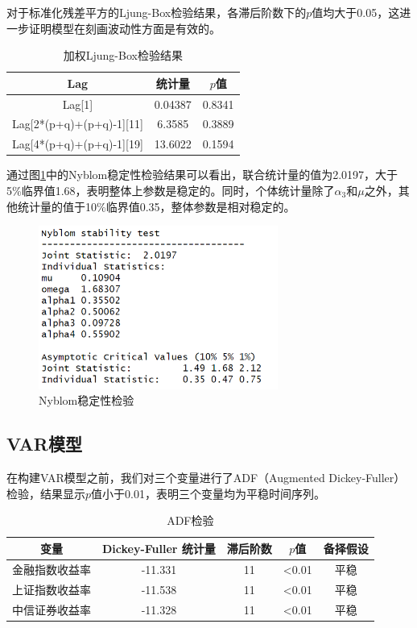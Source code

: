 \documentclass[12pt]{article}
\begin{document}
对于标准化残差平方的Ljung-Box检验结果，各滞后阶数下的$p$值均大于0.05，这进一步证明模型在刻画波动性方面是有效的。

\begin{table}[H]
    \centering
    \caption{加权Ljung-Box检验结果}
    \begin{tabular}{ccc}
        \toprule
        Lag & 统计量 & $p$值\\ 
        \midrule
        Lag[1] & 0.04387 & 0.8341\\
Lag[2*(p+q)+(p+q)-1][11] & 6.3585 & 0.3889\\
Lag[4*(p+q)+(p+q)-1][19] & 13.6022 & 0.1594\\
        \bottomrule
    \end{tabular}
\end{table}

通过图\ref{fig:Nyblom}中的Nyblom稳定性检验结果可以看出，联合统计量的值为2.0197，大于5\%临界值1.68，表明整体上参数是稳定的。同时，个体统计量除了$\alpha_{3}$和$\mu$之外，其他统计量的值于10\%临界值0.35，整体参数是相对稳定的。

\begin{figure}[H]
\centering
\includegraphics[width=0.7\textwidth]{Nyblom.png}
\caption{Nyblom稳定性检验}
\label{fig:Nyblom}
\end{figure}


\subsection{VAR模型}

在构建VAR模型之前，我们对三个变量进行了ADF（Augmented Dickey-Fuller）检验，结果显示$p$值小于0.01，表明三个变量均为平稳时间序列。

\begin{table}[H]
    \centering
    \caption{ADF检验}
    \label{tab:ADF}
    \begin{tabular}{ccccc}
        \toprule
        变量 & Dickey-Fuller 统计量 & 滞后阶数 & $p$值 & 备择假设 \\
        \midrule
        金融指数收益率 & -11.331 & 11 & \textless 0.01 & 平稳\\
        上证指数收益率 & -11.538 & 11 & \textless 0.01 & 平稳\\
        中信证券收益率 & -11.328 & 11 & \textless 0.01 & 平稳\\
        \bottomrule
    \end{tabular}
\end{table}
\end{document}
